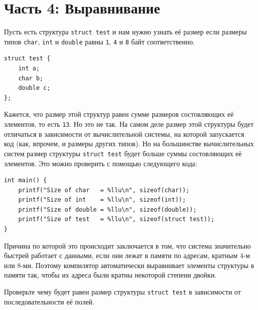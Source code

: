 \documentclass{article}
\begin{document}
\newpage
\section*{Часть 4: Выравнивание}
Пусть есть структура \texttt{struct test} и нам нужно узнать её размер если размеры типов \texttt{char}, \texttt{int} и \texttt{double} равны \texttt{1}, \texttt{4} и \texttt{8} байт соответственно.
\begin{lstlisting}
struct test {
    int a;
    char b;
    double c;
};
\end{lstlisting}
Кажется, что размер этой структур равен сумме размеров состовляющих её элементов, то есть \texttt{13}. Но это не так. 
На самом деле размер этой структуры будет отличаться в зависимости от вычислительной системы, на которой запускается код (как, впрочем, и размеры других типов). Но на большинстве вычислительных систем размер структуры \texttt{struct test} будет больше суммы состовляющих её элементов. Это можно проверить с помощью следующего кода:


\begin{lstlisting}
int main() {
    printf("Size of char   = %llu\n", sizeof(char));
    printf("Size of int    = %llu\n", sizeof(int));
    printf("Size of double = %llu\n", sizeof(double));
    printf("Size of test   = %llu\n", sizeof(struct test));
}
\end{lstlisting}

Причина по которой это происходит заключается в том, что система значительно быстрей работает с данными, если они лежат в памяти по адресам, кратным 4-м или 8-ми. Поэтому компилятор автоматически выравнивает элементы структуры в памяти так, чтобы их адреса были кратны некоторой степени двойки.

Проверьте чему будет равен размер структуры \texttt{struct test} в зависимости от последовательности её полей.



\newpage
\end{document}
